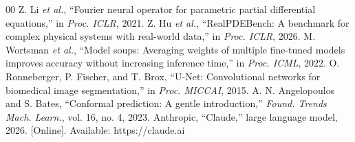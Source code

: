 \documentclass[conference,10pt]{IEEEtran}
\begin{document}
\begin{thebibliography}{00}
\scriptsize\setlength{\itemsep}{-1pt}
 Z. Li \textit{et al.}, ``Fourier neural operator for parametric partial differential equations,'' in \textit{Proc. ICLR}, 2021.
 Z. Hu \textit{et al.}, ``RealPDEBench: A benchmark for complex physical systems with real-world data,'' in \textit{Proc. ICLR}, 2026.
 M. Wortsman \textit{et al.}, ``Model soups: Averaging weights of multiple fine-tuned models improves accuracy without increasing inference time,'' in \textit{Proc. ICML}, 2022.
 O. Ronneberger, P. Fischer, and T. Brox, ``U-Net: Convolutional networks for biomedical image segmentation,'' in \textit{Proc. MICCAI}, 2015.
 A. N. Angelopoulos and S. Bates, ``Conformal prediction: A gentle introduction,'' \textit{Found. Trends Mach. Learn.}, vol. 16, no. 4, 2023.
 Anthropic, ``Claude,'' large language model, 2026. [Online]. Available: https://claude.ai
\end{thebibliography}
\end{document}
